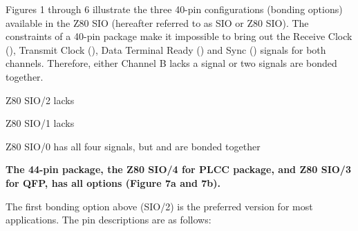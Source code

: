 \documentclass[10pt,twoside]{article}
\begin{document}
\begin{dscols}
Figures 1 through 6 illustrate the three 40-pin configurations (bonding
options) available in the Z80 SIO (hereafter referred to as SIO or Z80 SIO).
The constraints of a 40-pin package make it impossible to bring out the
Receive Clock (), Transmit Clock (), Data Terminal Ready
() and Sync () signals for both channels. Therefore, either
Channel B lacks a signal or two signals are bonded together.

\begin{featlist}
\item Z80 SIO/2 lacks 
\item Z80 SIO/1 lacks 
\end{featlist}

\columnbreak

\begin{featlist}
\item Z80 SIO/0 has all four signals, but  and  are bonded
      together
\end{featlist}

\vspace{5pt}
\textbf{The 44-pin package, the Z80 SIO/4 for PLCC package, and Z80 SIO/3 for
QFP, has all options (Figure 7a and 7b).}

The first bonding option above (SIO/2) is the preferred version for most
applications. The pin descriptions are as follows:

\end{dscols}

\pagefootrule
\clearpage

\dsrule
\vspace{6pt}

\noindent
\begin{minipage}[t]{0.56\textwidth}
  \centering
  
\end{minipage}%
\hfill
\begin{minipage}[t]{0.42\textwidth}
  \centering
  
\end{minipage}

\vspace{8pt}
\dsrule

\pagefootrule
\end{document}
